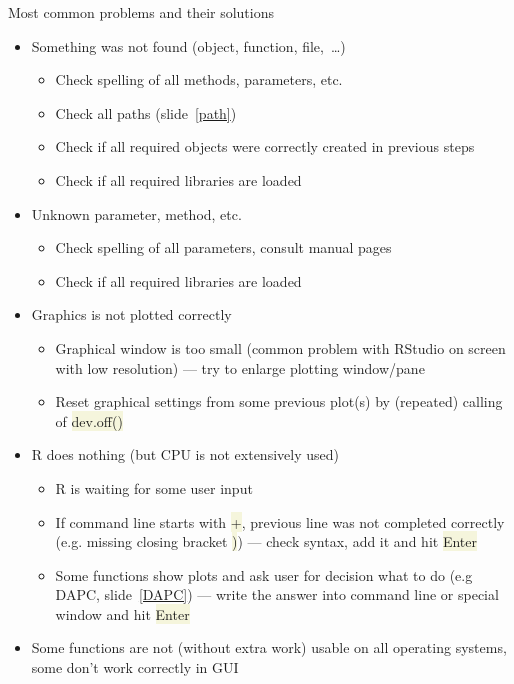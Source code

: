 \documentclass[compress, ucs, xelatex, 11pt, xcolor=svgnames, aspectratio=169,
	hyperref={
		bookmarks=true,
		unicode=true,
		colorlinks=true,
		pdftitle={Molecular data in R},
		plainpages=false,
		pdfauthor={Vojtech Zeisek},
		pdfsubject={Course about phylogeny and evolution in R},
		pdfcreator={XeLaTeX},
		pdfkeywords={R, evolution, phylogeny, molecular data},
		linkcolor=Crimson, %
		anchorcolor=Magenta, %
		citecolor=Magenta, %
		filecolor=Magenta, %
		menucolor=Magenta, %
		urlcolor=DodgerBlue, %
		pdftex},
	url={hyphens, lowtilde} %
	]{beamer}
\renewcommand{\texttt}[1]{\colorbox{Beige}{{\ttfamily #1}}}
\begin{document}
\begin{frame}[allowframebreaks]{Most common problems and their solutions}
	\label{problems}
	\begin{itemize}
		\item Something was not found (object, function, file,~\ldots)
		\begin{itemize}
			\item Check spelling of all methods, parameters, etc.
			\item Check all paths (slide~\ref{path})
			\item Check if all required objects were correctly created in previous steps
			\item Check if all required libraries are loaded
		\end{itemize}
		\item Unknown parameter, method, etc.
		\begin{itemize}
			\item Check spelling of all parameters, consult manual pages
			\item Check if all required libraries are loaded
		\end{itemize}
		\item Graphics is not plotted correctly
		\begin{itemize}
			\item Graphical window is too small (common problem with RStudio on screen with low resolution) --- try to enlarge plotting window/pane
			\item Reset graphical settings from some previous plot(s) by (repeated) calling of \texttt{dev.off()}
		\end{itemize}
		\item R does nothing (but CPU is not extensively used)
		\begin{itemize}
			\item R is waiting for some user input
			\item If command line starts with \texttt{+}, previous line was not completed correctly (e.g. missing closing bracket \texttt{)}) --- check syntax, add it and hit \texttt{Enter}
			\item Some functions show plots and ask user for decision what to do (e.g DAPC, slide~\ref{DAPC}) --- write the answer into command line or special window and hit \texttt{Enter}
		\end{itemize}
		\item Some functions are not (without extra work) usable on all operating systems, some don't work correctly in GUI

\end{itemize}
\end{frame}
\end{document}
